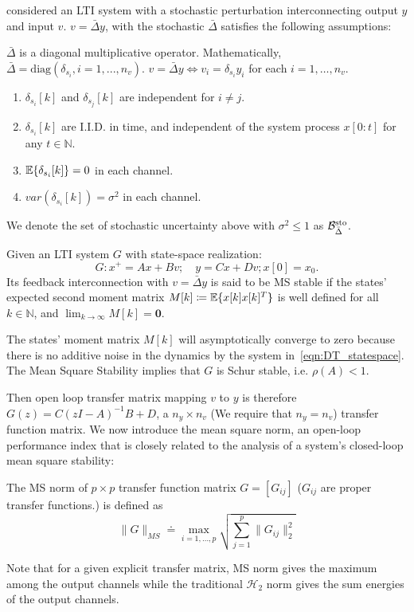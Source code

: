 \cite{Elia2005stabfading} considered an LTI system with a stochastic perturbation interconnecting  output $y$ and input $v$. $v=\bar{\Delta}y$, with the stochastic $\bar{\Delta}$ satisfies the following assumptions:
\begin{ass}\label{asp:MSS_stocDelta}
$\bar{\Delta}$ is a diagonal multiplicative operator. Mathematically, $\bar{\Delta}=\mathrm{diag}(\delta_{s_i},i=1,...,n_v)$. $v=\bar{\Delta}y \Leftrightarrow v_i=\delta_{s_i} y_i$ for each \(i=1,\hdots,n_v\).
\begin{enumerate}
    \item $\delta_{s_i}[k]$ and $\delta_{s_j}[k]$ are independent for $i\neq j$.
    \item $\delta_{s_i}[k]$ are I.I.D. in time, and independent of the system process \(x[0\colon t]\) for any \(t\in \mathbb{N}\).
    \item $\mathbb{E}\{\delta_{s_i}[k]\}=0$ in each channel.
    \item $var(\delta_{s_i}[k])=\sigma^2$ in each channel.    
\end{enumerate}
We denote the set of stochastic uncertainty above with $\sigma^2\leq 1$ as 
${\cal B}_{\bar{\Delta}}^{\mathrm{sto}}$.
\end{ass}



\begin{defn}
Given an LTI system \(G\) with state-space realization:
\begin{equation}\label{eqn:DT_statespace}
G: {x^+}={A}x+{B}{v};\quad {y}=C x+D v; x[0] = x_0.
\end{equation}
Its feedback interconnection with $v =\bar{\Delta} y$ is said to be MS stable if the states' expected second moment matrix $M[k] \coloneqq \mathbb{E}\{x[k]x[k]^T\}$ is well defined for all \(k \in \mathbb{N}\), and $\lim_{k\to\infty}M[k]=\mathbf{0}$.
\end{defn}
\begin{rem}
The states' moment matrix \(M[k]\) will asymptotically converge to zero because there is no additive noise in the dynamics by the system in~\eqref{eqn:DT_statespace}. The Mean Square Stability implies that \(G\) is Schur stable, i.e. $\rho(A)<1$.
\end{rem}





Then open loop transfer matrix mapping $v$ to $y$ is therefore
$G(z)=C(zI-A)^{-1}B+D$, a $n_y\times n_v$ (We require that $n_y = n_v$) transfer function matrix. We now introduce the mean square norm, an open-loop performance index that is closely related to the analysis of a system’s closed-loop mean square stability:
\begin{defn}\label{defn:MSnorm}
The MS norm of $p\times p$ transfer function matrix $G=[G_{ij}]$ ($G_{ij}$ are proper transfer functions.) is defined as 
$$
\|G\|_{MS} \doteq \max_{i=1,\hdots,p}\sqrt{\sum_{j=1}^p{\|G_{ij}\|_2^2}}  
$$
\end{defn}
Note that for a given explicit transfer matrix, MS norm gives the maximum among the output channels while the traditional $\mathcal{H}_2$ norm gives the sum energies of the output channels.

